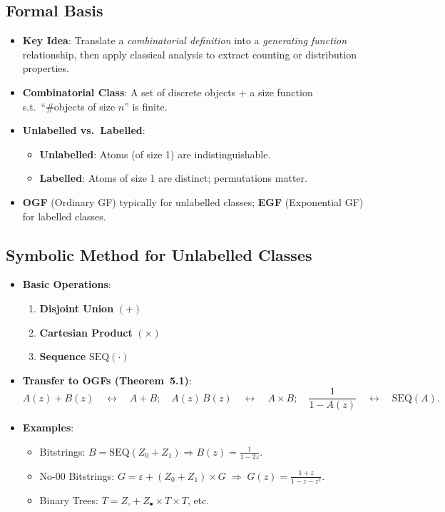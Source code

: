 \documentclass[11pt,letterpaper]{article}
\begin{document}
\subsection{Formal Basis}
\begin{itemize}
  \item \textbf{Key Idea}: Translate a \emph{combinatorial definition} into a \emph{generating function} relationship, then apply classical analysis to extract counting or distribution properties.
  \item \textbf{Combinatorial Class}: A set of discrete objects + a size function s.t.\ “\#objects of size $n$” is finite.
  \item \textbf{Unlabelled vs.\ Labelled}:
    \begin{itemize}
      \item \textbf{Unlabelled}: Atoms (of size 1) are indistinguishable.
      \item \textbf{Labelled}: Atoms of size 1 are distinct; permutations matter.
    \end{itemize}
  \item \textbf{OGF} (Ordinary GF) typically for unlabelled classes; \textbf{EGF} (Exponential GF) for labelled classes.
\end{itemize}

\subsection{Symbolic Method for Unlabelled Classes}
\begin{itemize}
  \item \textbf{Basic Operations}:
    \begin{enumerate}
      \item \textbf{Disjoint Union} $(+)$
      \item \textbf{Cartesian Product} $(\times)$
      \item \textbf{Sequence} $\mathrm{SEQ}(\cdot)$
    \end{enumerate}
  \item \textbf{Transfer to OGFs (Theorem~5.1)}:
    \[
      A(z)+B(z)\quad\leftrightarrow\quad A+B;\quad
      A(z)\,B(z)\quad\leftrightarrow\quad A\times B;\quad
      \frac{1}{1 - A(z)}\quad\leftrightarrow\quad \mathrm{SEQ}(A).
    \]
  \item \textbf{Examples}:
    \begin{itemize}
      \item Bitstrings: $B=\mathrm{SEQ}(Z_0+Z_1)\Rightarrow B(z)=\frac{1}{1-2z}.$
      \item No-00 Bitstrings: $G=\varepsilon+(Z_0+Z_1)\times G\;\Longrightarrow\;G(z)=\frac{1+z}{1 - z - z^2}.$
      \item Binary Trees: $T=Z_{\square}+Z_{\bullet}\times T\times T$, etc.
    \end{itemize}
\end{itemize}
\end{document}
